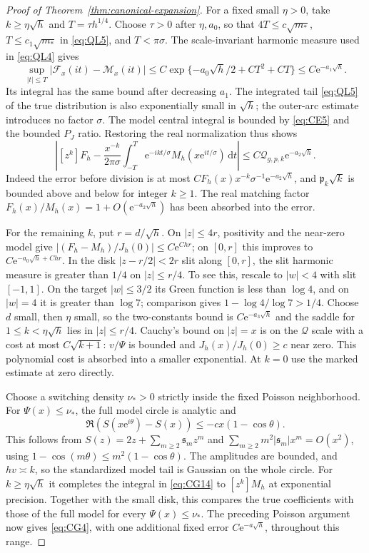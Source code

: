 \begin{proof}[Proof of Theorem~\ref{thm:canonical-expansion}]
For a fixed small $\eta>0$, take $k\ge\eta\sqrt h$ and
$T=\tau h^{1/4}$. Choose $\tau>0$ after $\eta,a_0$, so that
$4T\le c\sqrt{m_*}$, $T\le c_1\sqrt{m_*}$ in \eqref{eq:QL5},
and $T<\pi\sigma$. The scale-invariant harmonic measure used in
\eqref{eq:QL4} gives
\[
 \sup_{|t|\le T}|\mathscr F_x(it)-\mathscr M_x(it)|
 \le C\exp\{-a_0\sqrt h/2+C T^2+C T\}
 \le C\mathrm{e}^{-a_1\sqrt h}.
\]
Its integral has the same bound after decreasing $a_1$.
The integrated tail \eqref{eq:QL5} of the true distribution is also exponentially small
in $\sqrt h$; the outer-arc estimate introduces no factor $\sigma$.
The model central integral is bounded by \eqref{eq:CE5} and the
bounded $P_J$ ratio. Restoring the real normalization thus shows
\begin{equation}
 \left|[z^k]F_h-
 \frac{x^{-k}}{2\pi\sigma}\int_{-T}^T
             \mathrm{e}^{-ikt/\sigma}M_h(x\mathrm{e}^{it/\sigma})\,\mathrm{d}t\right|
 \le C\mathcal Q_{g,p,k}\mathrm{e}^{-a_2\sqrt h}.
 \label{eq:CG14}
\end{equation}
Indeed the error before division is at most
$CF_h(x)x^{-k}\sigma^{-1}\mathrm{e}^{-a_2\sqrt h}$, and
$\mathfrak p_k\sqrt k$ is bounded above and below for integer $k\ge1$.
The real matching factor $F_h(x)/M_h(x)=1+O(\mathrm e^{-a_2\sqrt h})$
has been absorbed into the error.

For the remaining $k$, put $r=d/\sqrt h$.
On $|z|\le4r$, positivity and the near-zero model give
$|(F_h-M_h)/J_h(0)|\le C\mathrm{e}^{Chr}$; on $[0,r]$ this improves to
$C\mathrm{e}^{-a_0\sqrt h+Chr}$. In the disk $|z-r/2|<2r$ slit along
$[0,r]$, the slit harmonic measure is greater than $1/4$ on
$|z|\le r/4$. To see this, rescale to $|w|<4$ with slit $[-1,1]$.
On the target $|w|\le3/2$ its Green function is less than $\log4$,
and on $|w|=4$ it is greater than $\log7$; comparison gives
$1-\log4/\log7>1/4$.
Choose $d$ small, then $\eta$ small, so the two-constants bound is
$C\mathrm{e}^{-a_3\sqrt h}$ and the saddle for $1\le k<\eta\sqrt h$
lies in $|z|\le r/4$. Cauchy's bound on $|z|=x$ is on the
$\mathcal Q$ scale with a cost at most $C\sqrt{k+1}$:
$v/\Psi$ is bounded and $J_h(x)/J_h(0)\ge c$ near zero.
This polynomial cost is absorbed into a smaller exponential.
At $k=0$ use the marked estimate at zero directly.

Choose a switching density $\nu_*>0$ strictly inside the fixed
Poisson neighborhood. For $\Psi(x)\le\nu_*$, the full model circle
is analytic and
\[
 \Re(S(x\mathrm{e}^{i\theta})-S(x))\le-cx(1-\cos\theta).
\]
This follows from $S(z)=2z+\sum_{m\ge2}\mathfrak s_mz^m$ and
$\sum_{m\ge2}m^2|\mathfrak s_m|x^m=O(x^2)$, using
$1-\cos(m\theta)\le m^2(1-\cos\theta)$.
The amplitudes are bounded, and $hv\asymp k$, so the standardized
model tail is Gaussian on the whole circle. For $k\ge\eta\sqrt h$
it completes the integral in \eqref{eq:CG14} to $[z^k]M_h$ at
exponential precision. Together with the small disk, this compares the
true coefficients with those of the full model for every
$\Psi(x)\le\nu_*$.
The preceding Poisson argument now gives \eqref{eq:CG4}, with one
additional fixed error $C\mathrm{e}^{-a\sqrt h}$, throughout this range.


\end{proof}
